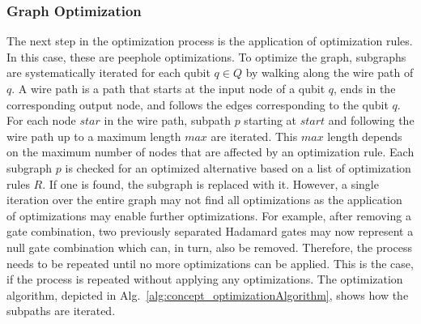 \subsubsection{Graph Optimization}
The next step in the optimization process is the application of optimization rules. In this case, these are peephole optimizations. To optimize the graph, subgraphs are systematically iterated for each qubit $q \in Q$ by walking along the wire path of $q$. 
A wire path is a path that starts at the input node of a qubit $q$, ends in the corresponding output node, and follows the edges corresponding to the qubit $q$. 
For each node $star$ in the wire path, subpath $p$ starting at $start$ and following the wire path up to a maximum length $max$ are iterated.
This $max$ length depends on the maximum number of nodes that are affected by an optimization rule.
Each subgraph $p$ is checked for an optimized alternative based on a list of optimization rules $R$. If one is found, the subgraph is replaced with it. 
However, a single iteration over the entire graph may not find all optimizations as the application of optimizations may enable further optimizations. 
For example, after removing a gate combination, two previously separated Hadamard gates may now represent a null gate combination which can, in turn, also be removed. 
Therefore, the process needs to be repeated until no more optimizations can be applied. This is the case, if the process is repeated without applying any optimizations.
The optimization algorithm, depicted in Alg.~\ref{alg:concept_optimizationAlgorithm}, shows how the subpaths are iterated.

